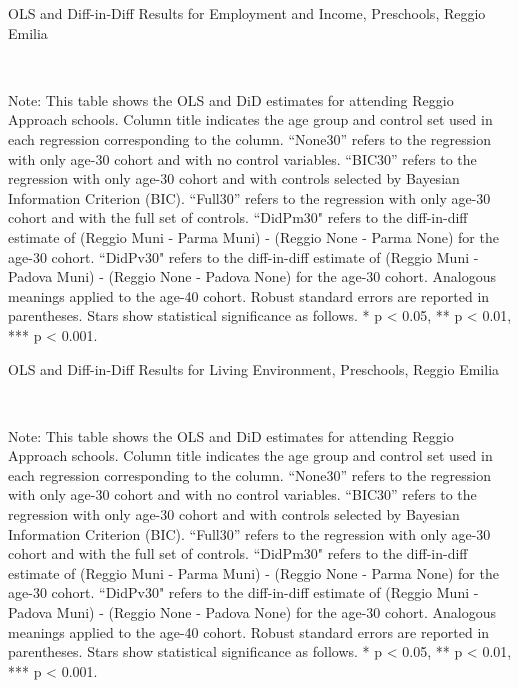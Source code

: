 \begin{landscape}
\begin{table}[H] \caption{OLS and Diff-in-Diff Results for Employment and Income, Preschools, Reggio Emilia} \label{ols-W-reg}
\scalebox{0.85}{
}
\vspace{1ex} \\
\footnotesize\raggedright{Note: This table shows the OLS and DiD estimates for attending Reggio Approach schools. Column title indicates the age group and control set used in each regression corresponding to the column. ``None30'' refers to the regression with only age-30 cohort and with no control variables. ``BIC30'' refers to the regression with only age-30 cohort and with controls selected by Bayesian Information Criterion (BIC). ``Full30'' refers to the regression with only age-30 cohort and with the full set of controls. ``DidPm30" refers to the diff-in-diff estimate of (Reggio Muni - Parma Muni) - (Reggio None - Parma None) for the age-30 cohort. ``DidPv30" refers to the diff-in-diff estimate of (Reggio Muni - Padova Muni) - (Reggio None - Padova None) for the age-30 cohort. Analogous meanings applied to the age-40 cohort. Robust standard errors are reported in parentheses. Stars show statistical significance as follows. * p < 0.05, ** p < 0.01, *** p < 0.001.}
\end{table}


\begin{table}[H] \caption{OLS and Diff-in-Diff Results for Living Environment, Preschools, Reggio Emilia} \label{ols-L-reg}
\scalebox{0.85}{
}
\vspace{1ex} \\
\footnotesize\raggedright{Note: This table shows the OLS and DiD estimates for attending Reggio Approach schools. Column title indicates the age group and control set used in each regression corresponding to the column. ``None30'' refers to the regression with only age-30 cohort and with no control variables. ``BIC30'' refers to the regression with only age-30 cohort and with controls selected by Bayesian Information Criterion (BIC). ``Full30'' refers to the regression with only age-30 cohort and with the full set of controls. ``DidPm30" refers to the diff-in-diff estimate of (Reggio Muni - Parma Muni) - (Reggio None - Parma None) for the age-30 cohort. ``DidPv30" refers to the diff-in-diff estimate of (Reggio Muni - Padova Muni) - (Reggio None - Padova None) for the age-30 cohort. Analogous meanings applied to the age-40 cohort. Robust standard errors are reported in parentheses. Stars show statistical significance as follows. * p < 0.05, ** p < 0.01, *** p < 0.001.}
\end{table}


\end{landscape}
